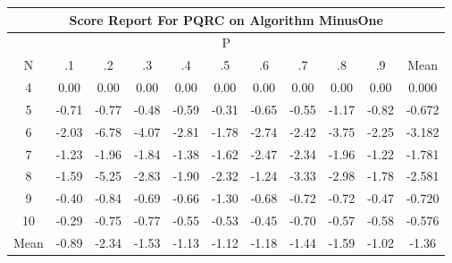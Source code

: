 \documentclass[11pt,a4paper]{report}
\begin{document}
\begin{longtable}{ | c || c | c | c | c | c | c | c | c | c || c |}
\hline
\multicolumn{11}{|c|}{ Score Report For PQRC on Algorithm MinusOne} \\
\hline
\multicolumn{11}{|c|}{ P } \\
\hline
N & .1 & .2 & .3 & .4 & .5 & .6 & .7 & .8 & .9 & Mean\\
 \hline
 \hline
 \endhead
  4 &  \cellcolor[HTML]{FFFFFF} 0.00 &  \cellcolor[HTML]{FFFFFF} 0.00 &  \cellcolor[HTML]{FFFFFF} 0.00 &  \cellcolor[HTML]{FFFFFF} 0.00 &  \cellcolor[HTML]{FFFFFF} 0.00 &  \cellcolor[HTML]{FFFFFF} 0.00 &  \cellcolor[HTML]{FFFFFF} 0.00 &  \cellcolor[HTML]{FFFFFF} 0.00 &  \cellcolor[HTML]{FFFFFF} 0.00 & 0.000 \\
  5 &  \cellcolor[HTML]{FFEFEF} -0.71 &  \cellcolor[HTML]{FFEFEF} -0.77 &  \cellcolor[HTML]{FFEFEF} -0.48 &  \cellcolor[HTML]{FFEFEF} -0.59 &  \cellcolor[HTML]{FFF7F7} -0.31 &  \cellcolor[HTML]{FFEFEF} -0.65 &  \cellcolor[HTML]{FFEFEF} -0.55 &  \cellcolor[HTML]{FFDFDF} -1.17 &  \cellcolor[HTML]{FFE7E7} -0.82 & -0.672 \\
  6 &  \cellcolor[HTML]{FFCFCF} -2.03 &  \cellcolor[HTML]{FF5858} -6.78 &  \cellcolor[HTML]{FF9797} -4.07 &  \cellcolor[HTML]{FFB7B7} -2.81 &  \cellcolor[HTML]{FFCFCF} -1.78 &  \cellcolor[HTML]{FFB7B7} -2.74 &  \cellcolor[HTML]{FFBFBF} -2.42 &  \cellcolor[HTML]{FF9F9F} -3.75 &  \cellcolor[HTML]{FFC7C7} -2.25 & -3.182 \\
  7 &  \cellcolor[HTML]{FFDFDF} -1.23 &  \cellcolor[HTML]{FFCFCF} -1.96 &  \cellcolor[HTML]{FFCFCF} -1.84 &  \cellcolor[HTML]{FFDFDF} -1.38 &  \cellcolor[HTML]{FFD7D7} -1.62 &  \cellcolor[HTML]{FFBFBF} -2.47 &  \cellcolor[HTML]{FFC7C7} -2.34 &  \cellcolor[HTML]{FFCFCF} -1.96 &  \cellcolor[HTML]{FFDFDF} -1.22 & -1.781 \\
  8 &  \cellcolor[HTML]{FFD7D7} -1.59 &  \cellcolor[HTML]{FF7878} -5.25 &  \cellcolor[HTML]{FFB7B7} -2.83 &  \cellcolor[HTML]{FFCFCF} -1.90 &  \cellcolor[HTML]{FFC7C7} -2.32 &  \cellcolor[HTML]{FFDFDF} -1.24 &  \cellcolor[HTML]{FFAFAF} -3.33 &  \cellcolor[HTML]{FFB7B7} -2.98 &  \cellcolor[HTML]{FFCFCF} -1.78 & -2.581 \\
  9 &  \cellcolor[HTML]{FFF7F7} -0.40 &  \cellcolor[HTML]{FFE7E7} -0.84 &  \cellcolor[HTML]{FFEFEF} -0.69 &  \cellcolor[HTML]{FFEFEF} -0.66 &  \cellcolor[HTML]{FFDFDF} -1.30 &  \cellcolor[HTML]{FFEFEF} -0.68 &  \cellcolor[HTML]{FFEFEF} -0.72 &  \cellcolor[HTML]{FFEFEF} -0.72 &  \cellcolor[HTML]{FFF7F7} -0.47 & -0.720 \\
  10 &  \cellcolor[HTML]{FFF7F7} -0.29 &  \cellcolor[HTML]{FFEFEF} -0.75 &  \cellcolor[HTML]{FFEFEF} -0.77 &  \cellcolor[HTML]{FFEFEF} -0.55 &  \cellcolor[HTML]{FFEFEF} -0.53 &  \cellcolor[HTML]{FFF7F7} -0.45 &  \cellcolor[HTML]{FFEFEF} -0.70 &  \cellcolor[HTML]{FFEFEF} -0.57 &  \cellcolor[HTML]{FFEFEF} -0.58 & -0.576 \\
 \hline
 \hline
Mean &  \cellcolor[HTML]{FFE7E7} -0.89 &  \cellcolor[HTML]{FFC7C7} -2.34 &  \cellcolor[HTML]{FFD7D7} -1.53 &  \cellcolor[HTML]{FFDFDF} -1.13 &  \cellcolor[HTML]{FFDFDF} -1.12 &  \cellcolor[HTML]{FFDFDF} -1.18 &  \cellcolor[HTML]{FFD7D7} -1.44 &  \cellcolor[HTML]{FFD7D7} -1.59 &  \cellcolor[HTML]{FFE7E7} -1.02 &  \cellcolor[HTML]{FFDFDF} -1.36
\end{longtable}
\end{document}
